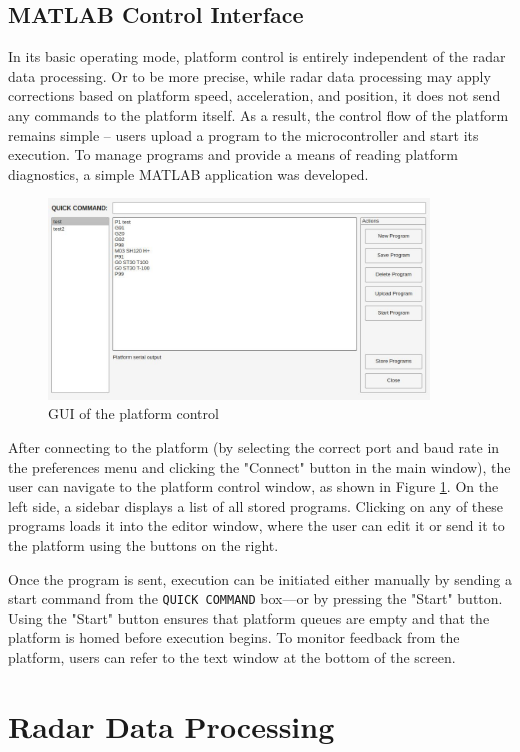 \section{MATLAB Control Interface}

In its basic operating mode, platform control is entirely independent of the radar data processing.
Or to be more precise, while radar data processing may apply corrections based on platform speed, acceleration, and position, it does not send any commands to the platform itself.
As a result, the control flow of the platform remains simple -- users upload a program to the microcontroller and start its execution.
To manage programs and provide a means of reading platform diagnostics, a simple MATLAB application was developed.

\begin{figure}[h!]
	\centering
	\includegraphics[width=0.9\textwidth]{../img/platform_control.jpg}
	\caption[GUI of the platform control]{GUI of the platform control}
	\label{fig:platformControl}
\end{figure}

After connecting to the platform (by selecting the correct port and baud rate in the preferences menu and clicking the "Connect" button in the main window), the user can navigate to the platform control window, as shown in Figure \ref{fig:platformControl}.
On the left side, a sidebar displays a list of all stored programs.
Clicking on any of these programs loads it into the editor window, where the user can edit it or send it to the platform using the buttons on the right.

Once the program is sent, execution can be initiated either manually by sending a start command from the \verb|QUICK COMMAND| box—or by pressing the "Start" button.
Using the "Start" button ensures that platform queues are empty and that the platform is homed before execution begins.
To monitor feedback from the platform, users can refer to the text window at the bottom of the screen.

\chapter{Radar Data Processing}






\listoffigures

\listoftables

\clearpage
\openright


